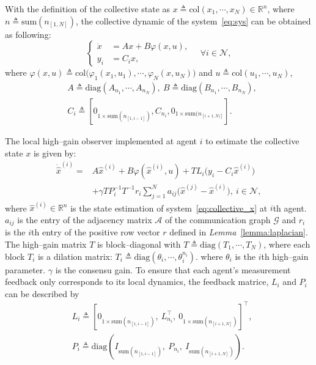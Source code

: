 \documentclass{ifacconf}
\begin{document}
With the definition of the collective state as $x\triangleq\mathrm{col} (x_1,\cdots,x_N) \in \mathbb{R}^n$, where $n \triangleq \mathrm{sum}(n_{[1,N]})$, the collective dynamic of the system~\eqref{eq:sys} can be obtained as following:
\begin{equation}
    \left\{\begin{aligned}
        \dot{x} &= A x + B \varphi(x,u), \\
        y_{i} &= C_{i} x,
    \end{aligned}\right. \quad \forall i\in\mathcal{N},
    \label{eq:collective_x}
\end{equation}
where $\varphi(x,u) \triangleq \mathrm{col} \big( \varphi_1(x_1,u_1), \cdots, \varphi_N(x,u_N)\big)$ and $u\triangleq\mathrm{col}(u_1,\cdots,u_N)$, 
\begin{equation}
    \begin{aligned}
        &A\triangleq\mathrm{diag}(A_{n_1},\cdots,A_{n_{N}}),\
        B\triangleq\mathrm{diag}(B_{n_1},\cdots,B_{n_{N}}),\\
        &C_i \triangleq \left[0_{1\times\mathrm{sum}(n_{[1,i-1]})},C_{n_i},0_{1\times\mathrm{sum}(n_{[i+1,N)]}}\right].
    \end{aligned} 
\end{equation}

The local high--gain observer implemented at agent $i$ to estimate the collective state $x$ is given by: 
\begin{equation}
    \begin{aligned}
        \dot{\hat{x}}^{(i)}=&A\hat{x}^{(i)}+B\varphi(\hat{x}^{(i)},u)+TL_i\big(y_i-C_i \hat{x}^{(i)}\big)\\
        &+\gamma T P_i^{-1}T^{-1}r_i\sum^N_{j=1}a_{ij}\big(\hat{x}^{(j)}-\hat{x}^{(i)}\big),\ i \in \mathcal{N},
    \end{aligned}\label{eq:distributed_HGO}
\end{equation}
where $\hat{x}^{(i)} \in \mathbb{R}^{n}$ is the state estimation of system~\eqref{eq:collective_x} at $i$th agent.
$a_{ij}$ is the entry of the adjacency matrix $\mathcal{A}$ of the communication graph $\mathcal{G}$ and $r_i$ is the $i$th entry of the positive row vector $r$ defined in {\it Lemma}~\ref{lemma:laplacian}.
The high--gain matrix $T$ is block--diagonal with $T \triangleq \mathrm{diag}(T_1,\cdots, T_N)$, where each block $T_i$ is a dilation matrix: $T_i\triangleq\mathrm{diag}(\theta_i,\cdots,\theta_i^{n_i})$. where $\theta_i$ is the $i$th high--gain parameter. $\gamma$ is the consensu gain.
To ensure that each agent's measurement feedback only corresponds to its local dynamics, the feedback matrice, $L_i$ and $P_i$ can be described by 
\begin{equation}
    \begin{aligned}
        &L_i\triangleq\left[0_{1\times\mathrm{sum}(n_{[1,i-1]})},\ L_{n_i}^\top,\ 0_{1\times\mathrm{sum}(n_{[i+1,N]})}\right]^\top, \\ 
        &P_{i}\triangleq\mathrm{diag}\left(I_{\mathrm{sum}(n_{[1,i-1]})},\ P_{n_{i}},\ I_{\mathrm{sum}(n_{[i+1,N]})}\right).
    \end{aligned}
\end{equation}
\end{document}
